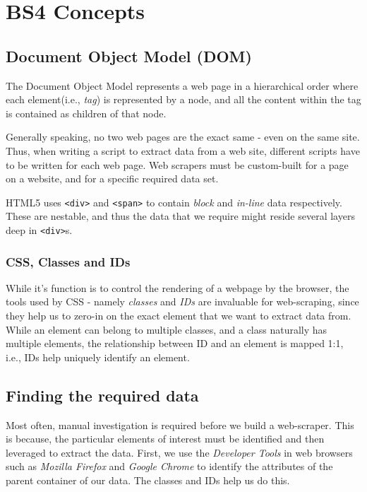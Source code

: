 \chapter{BS4 Concepts}

\section{Document Object Model (DOM)}
The Document Object Model represents a web page in a hierarchical order where each element(i.e., \textit{tag}) is represented by a node, and all the content within the tag is contained as children of that node. 

Generally speaking, no two web pages are the exact same - even on the same site. Thus, when writing a script to extract data from a web site, different scripts have to be written for each web page. Web scrapers must be custom-built for a page on a website, and for a specific required data set. 

HTML5 uses \verb|<div>| and \verb|<span>| to contain \textit{block} and \textit{in-line} data respectively. These are nestable, and thus the data that we require might reside several layers deep in \verb|<div>|s. 

\subsection{CSS, Classes and IDs}
While it's function is to control the rendering of a webpage by the browser, the tools used by CSS - namely \textit{classes} and \textit{IDs} are invaluable for web-scraping, since they help us to zero-in on the exact element that we want to extract data from. While an element can belong to multiple classes, and a class naturally has multiple elements, the relationship between ID and an element is mapped 1:1, i.e., IDs help uniquely identify an element. 

\section{Finding the required data}
Most often, manual investigation is required before we build a web-scraper. This is because, the particular elements of interest must be identified and then leveraged to extract the data. First, we use the \textit{Developer Tools} in web browsers such as \textit{Mozilla Firefox} and \textit{Google Chrome} to identify the attributes of the parent container of our data. The classes and IDs help us do this.

